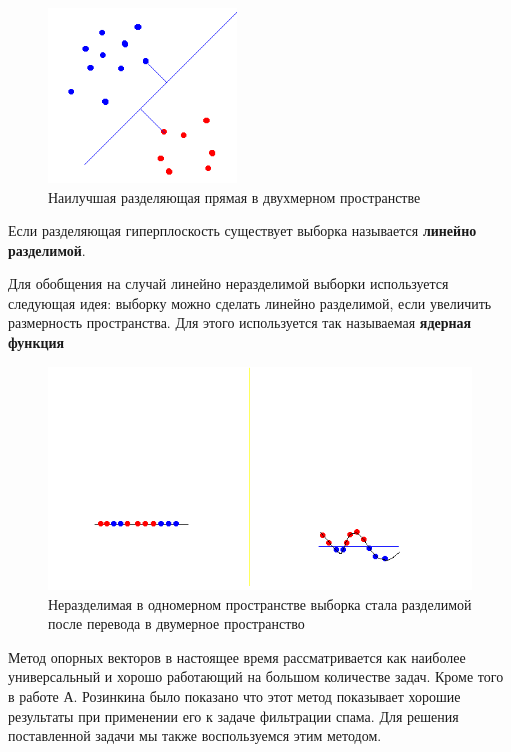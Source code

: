 \begin{figure}[h]
\begin{center}
\includegraphics[width=5cm]{img/svm}
\end{center}
\caption{Наилучшая разделяющая прямая в двухмерном пространстве}
\label{svm}
\end{figure}

Если разделяющая гиперплоскость существует выборка называется \textbf{линейно разделимой}.

Для обобщения на случай линейно неразделимой выборки используется следующая идея: выборку можно сделать линейно разделимой, если увеличить размерность пространства. Для этого используется так называемая \textbf{ядерная функция}

\begin{figure}[h]
\begin{center}
\includegraphics[width=15cm]{img/svm2}
\end{center}
\caption{Неразделимая в одномерном пространстве выборка стала разделимой после перевода в двумерное пространство}
\label{svm-kernel}
\end{figure}

Метод опорных векторов в настоящее время рассматривается как наиболее универсальный и хорошо работающий на большом количестве задач. Кроме того в работе А. Розинкина было показано что этот метод показывает хорошие результаты при применении его к задаче фильтрации спама. Для решения поставленной задачи мы также воспользуемся этим методом.

